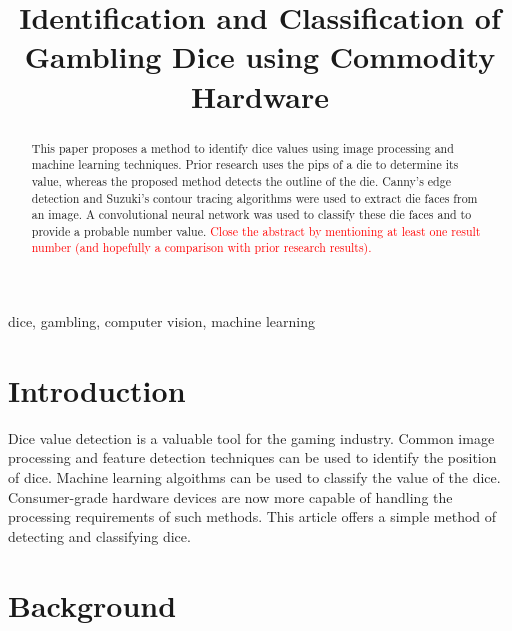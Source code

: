 \documentclass[conference]{IEEEtran}
\begin{document}
\title{
	Identification and Classification of Gambling Dice using Commodity Hardware
}

\author{
}

\maketitle

\begin{abstract}
	This paper proposes a method to identify dice values using image processing and machine learning techniques.
	Prior research uses the pips of a die to determine its value, whereas the proposed method detects the outline of the die.
	Canny's edge detection and Suzuki's contour tracing algorithms were used to extract die faces from an image.
	A convolutional neural network was used to classify these die faces and to provide a probable number value.
	\textcolor{red}{Close the abstract by mentioning at least one result number (and hopefully a comparison with prior research results).}
\end{abstract}

\begin{IEEEkeywords}
	dice, gambling, computer vision, machine learning
\end{IEEEkeywords}

\section{Introduction}

Dice value detection is a valuable tool for the gaming industry.
Common image processing and feature detection techniques can be used to identify the position of dice.
Machine learning algoithms can be used to classify the value of the dice.
Consumer-grade hardware devices are now more capable of handling the processing requirements of such methods.
This article offers a simple method of detecting and classifying dice.

\section{Background}
\end{document}
